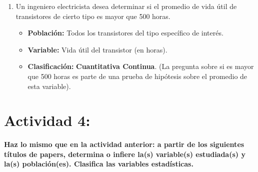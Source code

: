 \documentclass[12pt, letterpaper]{article}
\begin{document}
\begin{enumerate}
    \item Un ingeniero electricista desea determinar si el promedio de vida útil de transistores de cierto tipo es mayor que 500 horas.
        \begin{itemize}
            \item \textbf{Población:} Todos los transistores del tipo específico de interés.
            \item \textbf{Variable:} Vida útil del transistor (en horas).
            \item \textbf{Clasificación:} \textbf{Cuantitativa Continua}. (La pregunta sobre si es mayor que 500 horas es parte de una prueba de hipótesis sobre el promedio de esta variable).
        \end{itemize}
\end{enumerate}

\newpage %
\section{Actividad 4:}
\textbf{Haz lo mismo que en la actividad anterior: a partir de los siguientes títulos de papers, determina o infiere la(s) variable(s) estudiada(s) y la(s) población(es). Clasifica las variables estadísticas.}
\end{document}
